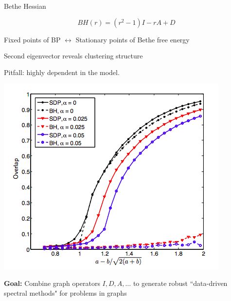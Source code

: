 \documentclass{beamer}
\begin{document}
\begin{frame}{Bethe Hessian}

$$BH(r) = (r^2 -1 )I - rA + D$$
\smallskip

Fixed points of BP $\longleftrightarrow$ Stationary points of Bethe free energy

\smallskip
Second eigenvector reveals clustering structure


Pitfall: highly dependent in the model. %

\begin{minipage}{0.48\textwidth}
\includegraphics[width=\textwidth]{figs/plot}
\end{minipage}
\begin{minipage}{0.49\textwidth}
\pause
{\small
\textbf{Goal:} Combine graph operators $I,D,A,\ldots$ to generate robust ``data-driven spectral methods" for problems in graphs
}
\end{minipage}

\let\thefootnote\relax{}
\let\thefootnote\relax{}
\end{frame}
\end{document}
